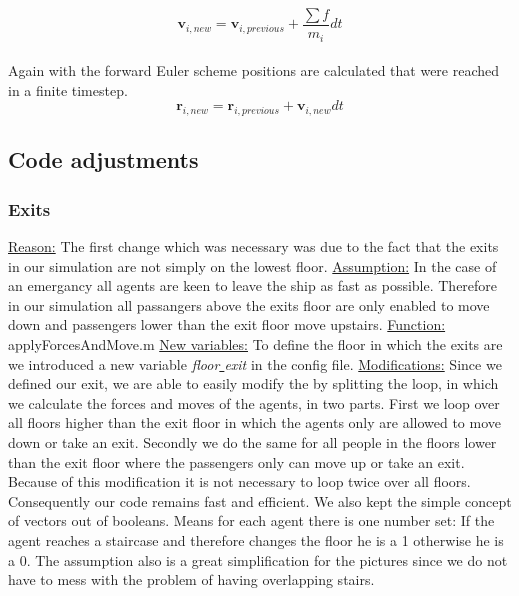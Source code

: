 \documentclass[11pt]{article}
\begin{document}
\begin{equation}
\mathbf{v}_{i,new} = \mathbf{v}_{i,previous} + \frac{\sum {f}}{m_{i}}dt
\end{equation}
\\
Again with the forward Euler scheme positions are calculated that were reached in a finite timestep.\\

\begin{equation}
\mathbf{r}_{i,new}=\mathbf{r}_{i,previous}+\mathbf{v}_{i,new}dt
\end{equation}

\subsection{Code adjustments}
\subsubsection{Exits}
\underline{Reason:}
\newline
The first change which was necessary was due to the fact that the exits in our simulation are not simply on the lowest floor.
\newline
\underline{Assumption:}
\newline
In the case of an emergancy all agents are keen to leave the ship as fast as possible. Therefore in our simulation all passangers above the exits floor are only enabled to move down and passengers lower than the exit floor move upstairs.
\newline
\underline{Function:}
\newline
applyForcesAndMove.m
\newline
\underline{New variables:}
\newline 
To define the floor in which the exits are we introduced a new variable \textit{floor\underline{ }exit} in the config file.
\newline
\underline{Modifications:}
\newline
Since we defined our exit, we are able to easily modify the by splitting the loop, in which we calculate the forces and moves of the agents, in two parts. First we loop over all floors higher than the exit floor in which the agents only are allowed to move down or take an exit. Secondly we do the same for all people in the floors lower than the exit floor where the passengers only can move up or take an exit.
\newline
Because of this modification it is not necessary to loop twice over all floors. Consequently our code remains fast and efficient. We also kept the simple concept of vectors out of booleans. Means for each agent there is one number set: If the agent reaches a staircase and therefore changes the floor he is a 1 otherwise he is a 0. The assumption also is a great simplification for the pictures since we do not have to mess with the problem of having overlapping stairs.
\end{document}
